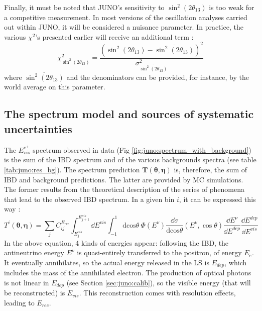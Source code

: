 \documentclass[../main.tex]{subfiles}
\begin{document}
Finally, it must be noted that JUNO's sensitivity to $\sin^2(2\theta_{13})$ is too weak for a competitive measurement. In most versions of the oscillation analyses carried out within JUNO, it will be considered a nuisance parameter. In practice, the various $\chi^2$'s presented earlier will receive an additional term :
\begin{equation}
  \chi^2_{\sin^2(2\theta_{13})} = \frac{(\sin^2(2\theta_{13})-\overline{\sin^2(2\theta_{13})})^2}{\sigma^2_{\overline{\sin^2(2\theta_{13})}}}
\end{equation}
where $\overline{\sin^2(2\theta_{13})}$ and the denominators can be provided, for instance, by the world average on this parameter.

\subsection{The spectrum model and sources of systematic uncertainties}

The $E^{e^+}_{vis}$ spectrum observed in data (Fig \ref{fig:juno:spectrum_with_background}) is the sum of the IBD spectrum and of the various backgrounds spectra (see table \ref{tab:juno:res_bg}).
The spectrum prediction $\bm{T}\left(\bm{\theta},\bm{\eta}\right)$ is, therefore, the sum of IBD and background predictions. The latter are provided by MC simulations. The former results from the theoretical description of the series of phenomena that lead to the observed IBD spectrum. In a given bin $i$, it can be expressed this way :
\begin{equation}
  \label{eq:juno:bin_content}
  T^i(\bm{\theta},\bm{\eta}) =\sum_{j} C_{ij}^{E_{rec}} \int_{E^{vis}_{j}}^{E^{vis}_{j+1}} \dd E^{vis} \int_{-1}^{1} \mathrm{dcos}\theta ~ \Phi(E^{\nu}) \frac{\dd\sigma}{\mathrm{dcos}\theta}(E^{\nu}, \cos\theta) \frac{\dd E^{\nu}}{\dd E^{dep}} \frac{\dd E^{dep}}{\dd E^{vis}}
\end{equation}
In the above equation, 4 kinds of energies appear: following the IBD, the antineutrino energy $E^{\nu}$ is quasi-entirely transferred to the positron, of energy $E_{e}$. It eventually annihilates, so the actual energy released in the LS is $E_{dep}$, which includes the mass of the annihilated electron. The production of optical photons is not linear in $E_{dep}$ (see Section \ref{sec:juno:calib}), so the visible energy (that will be reconstructed) is $E_{vis}$. This reconstruction comes with resolution effects, leading to $E_{rec}$.
\end{document}
